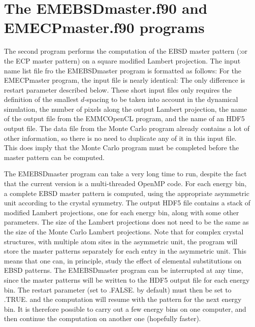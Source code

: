 \documentclass[DIV=calc, paper=letter, fontsize=11pt]{scrartcl}	 %
\begin{document}
\section{The \protect\textsf{EMEBSDmaster.f90} and \protect\textsf{EMECPmaster.f90} programs\label{sec:f90EBSDmaster}}
The second program performs the computation of the EBSD master pattern (:or the ECP master pattern) on a
square modified Lambert projection. The input name list file fro the \textsf{EMEBSDmaster} program is formatted as follows:
For the \textsf{EMECPmaster} program, the input file is nearly identical:
The only difference is \textsf{restart} parameter described below.
These short input files only requires the definition of the smallest $d$-spacing to be taken into account 
in the dynamical simulation, the number of pixels along the output Lambert projection, the name of the 
output file from the \textsf{EMMCOpenCL} program, and the name of an HDF5 output file.  The data file from
the Monte Carlo program already contains a lot of other information, so there is no need to duplicate 
any of it in this input file.  This does imply that the Monte Carlo program must be completed before the 
master pattern can be computed.

The \textsf{EMEBSDmaster} program can take a very long time to run, despite the fact that the current version is a multi-threaded OpenMP code.
For each energy bin, a complete EBSD master pattern is computed, using the appropriate asymmetric unit according to
the crystal symmetry.  The output HDF5 file contains a stack of modified Lambert projections, one for each energy bin, along with 
some other parameters.  The size of the Lambert projections does not need to be the same as the size of the Monte Carlo
Lambert projections.  %
Note that for complex crystal structures,
with multiple atom sites in the asymmetric unit, the program will store the master patterns separately for each entry in the asymmetric unit.
This means that one can, in principle, study the effect of elemental substitutions on EBSD patterns.  The \textsf{EMEBSDmaster}
program can be interrupted at any time, since the master patterns will be written to the HDF5 output file for each energy bin.
The \textsf{restart} parameter (set to \textsf{.FALSE.} by default) must then be set to \textsf{.TRUE.} and the computation will
resume with the pattern for the next energy bin.  It is therefore possible to carry out a few energy bins on one computer, and then
continue the computation on another one (hopefully faster).
\end{document}
